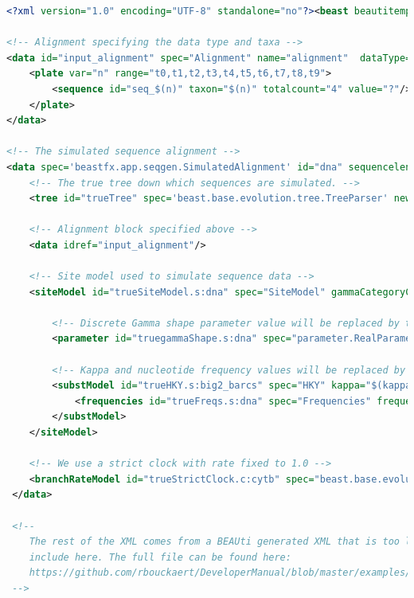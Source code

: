 \documentclass[oneside]{article}
\begin{document}
{\scriptsize
\begin{lstlisting}[language=XML, breaklines=true, backgroundcolor=\color{light-gray}]
<?xml version="1.0" encoding="UTF-8" standalone="no"?><beast beautitemplate='Standard' beautistatus='' namespace="beast.core:beast.evolution.alignment:beast.evolution.tree.coalescent:beast.core.util:beast.evolution.nuc:beast.evolution.operators:beast.evolution.sitemodel:beast.evolution.substitutionmodel:beast.base.evolution.alignment:beast.pkgmgmt:beast.base.core:beast.base.inference:beast.base.evolution.tree.coalescent:beast.pkgmgmt:beast.base.core:beast.base.inference.util:beast.evolution.nuc:beast.base.evolution.operator:beast.base.inference.operator:beast.base.evolution.sitemodel:beast.base.evolution.substitutionmodel:beast.base.evolution.likelihood" required="" version="2.7">

<!-- Alignment specifying the data type and taxa -->
<data id="input_alignment" spec="Alignment" name="alignment"  dataType="nucleotide">
    <plate var="n" range="t0,t1,t2,t3,t4,t5,t6,t7,t8,t9">
        <sequence id="seq_$(n)" taxon="$(n)" totalcount="4" value="?"/>
    </plate>
</data>

<!-- The simulated sequence alignment -->
<data spec='beastfx.app.seqgen.SimulatedAlignment' id="dna" sequencelength="$(sl=100)">
    <!-- The true tree down which sequences are simulated. -->
    <tree id="trueTree" spec='beast.base.evolution.tree.TreeParser' newick="$(tree)" IsLabelledNewick="true" adjustTipHeights="false" taxa="@input_alignment"/>

    <!-- Alignment block specified above -->
    <data idref="input_alignment"/>

    <!-- Site model used to simulate sequence data -->
    <siteModel id="trueSiteModel.s:dna" spec="SiteModel" gammaCategoryCount="4" proportionInvariant="0.0" mutationRate="1.0">

        <!-- Discrete Gamma shape parameter value will be replaced by the true value -->
        <parameter id="truegammaShape.s:dna" spec="parameter.RealParameter"  name="shape">$(gammaShape)</parameter>
        
        <!-- Kappa and nucleotide frequency values will be replaced by the true values -->
        <substModel id="trueHKY.s:big2_barcs" spec="HKY" kappa="$(kappa)">
            <frequencies id="trueFreqs.s:dna" spec="Frequencies" frequencies="$(freqParameter.1) $(freqParameter.2)  $(freqParameter.3) $(freqParameter.4)"/>
        </substModel>
    </siteModel> 
      
    <!-- We use a strict clock with rate fixed to 1.0 -->
    <branchRateModel id="trueStrictClock.c:cytb" spec="beast.base.evolution.branchratemodel.StrictClockModel" clock.rate="1.0"/>
 </data>
 
 <!--
 	The rest of the XML comes from a BEAUti generated XML that is too long to
 	include here. The full file can be found here:
	https://github.com/rbouckaert/DeveloperManual/blob/master/examples/yule/input.xml
 -->
\end{lstlisting}
}
\end{document}
